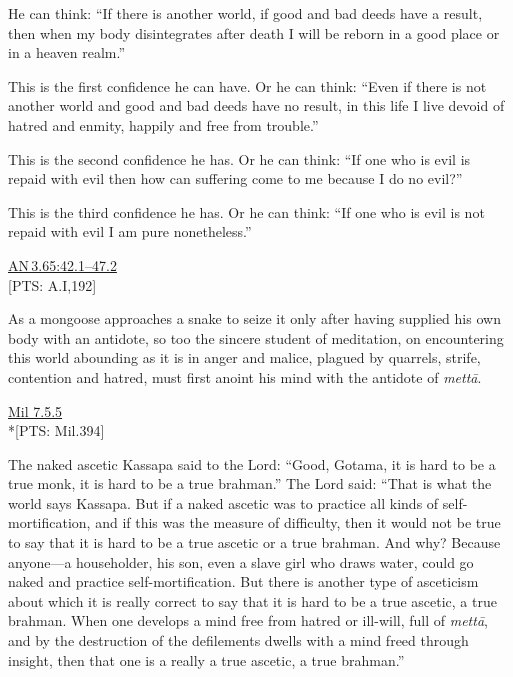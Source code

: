 \documentclass[10pt, openright]{book}
\begin{document}
He can think: “If there is another world, if good and bad deeds have a result, then when my body disintegrates after death I will be reborn in a good place or in a heaven realm.”


This is the first confidence he can have. Or he can think: “Even if there is not another world and good and bad deeds have no result, in this life I live devoid of hatred and enmity, happily and free from trouble.”


This is the second confidence he has. Or he can think: “If one who is evil is repaid with evil then how can suffering come to me because I do no evil?”


This is the third confidence he has. Or he can think: “If one who is evil is not repaid with evil I am pure nonetheless.”


\begin{flushright}
\href{https://suttacentral.net/an3.65/en/sujato\#42.1}{AN 3.65:42.1–47.2}\\

[PTS: A.I,192]


\end{flushright}
As a mongoose approaches a snake to seize it only after having supplied his own body with an antidote, so too the sincere student of meditation, on encountering this world abounding as it is in anger and malice, plagued by quarrels, strife, contention and hatred, must first anoint his mind with the antidote of \textit{mettā}.


\begin{flushright}
\href{https://suttacentral.net/mil7.5.5/en/tw_rhysdavids}{Mil 7.5.5}\\

*[PTS: Mil.394]


\end{flushright}
The naked ascetic Kassapa said to the Lord: “Good, Gotama, it is hard to be a true monk, it is hard to be a true brahman.” The Lord said: “That is what the world says Kassapa. But if a naked ascetic was to practice all kinds of self-mortification, and if this was the measure of difficulty, then it would not be true to say that it is hard to be a true ascetic or a true brahman. And why? Because anyone—a householder, his son, even a slave girl who draws water, could go naked and practice self-mortification. But there is another type of asceticism about which it is really correct to say that it is hard to be a true ascetic, a true brahman. When one develops a mind free from hatred or ill-will, full of \textit{mettā}, and by the destruction of the defilements dwells with a mind freed through insight, then that one is a really a true ascetic, a true brahman.”
\end{document}
